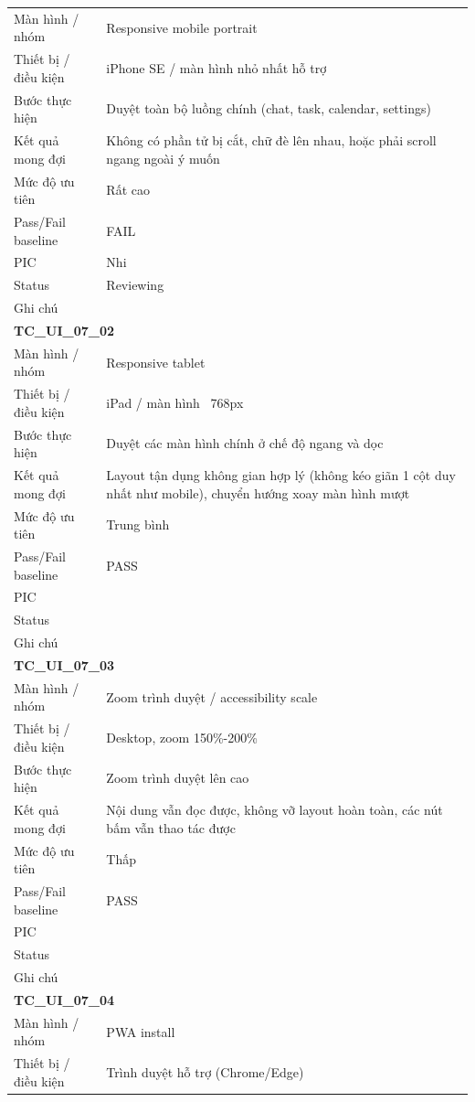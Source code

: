 \documentclass[12pt,a4paper]{article}
\begin{document}
\begin{longtable}{p{3.0cm}p{11.5cm}}
Màn hình / nhóm & Responsive mobile portrait \\
Thiết bị / điều kiện & iPhone SE / màn hình nhỏ nhất hỗ trợ \\
Bước thực hiện & Duyệt toàn bộ luồng chính (chat, task, calendar, settings) \\
Kết quả mong đợi & Không có phần tử bị cắt, chữ đè lên nhau, hoặc phải scroll ngang ngoài ý muốn \\
Mức độ ưu tiên & Rất cao \\
Pass/Fail baseline & FAIL \\
PIC & Nhi \\
Status & Reviewing \\
Ghi chú &  \\
\midrule
\multicolumn{2}{l}{\textbf{TC\_UI\_07\_02}} \\
Màn hình / nhóm & Responsive tablet \\
Thiết bị / điều kiện & iPad / màn hình ~768px \\
Bước thực hiện & Duyệt các màn hình chính ở chế độ ngang và dọc \\
Kết quả mong đợi & Layout tận dụng không gian hợp lý (không kéo giãn 1 cột duy nhất như mobile), chuyển hướng xoay màn hình mượt \\
Mức độ ưu tiên & Trung bình \\
Pass/Fail baseline & PASS \\
PIC &  \\
Status &  \\
Ghi chú &  \\
\midrule
\multicolumn{2}{l}{\textbf{TC\_UI\_07\_03}} \\
Màn hình / nhóm & Zoom trình duyệt / accessibility scale \\
Thiết bị / điều kiện & Desktop, zoom 150\%-200\% \\
Bước thực hiện & Zoom trình duyệt lên cao \\
Kết quả mong đợi & Nội dung vẫn đọc được, không vỡ layout hoàn toàn, các nút bấm vẫn thao tác được \\
Mức độ ưu tiên & Thấp \\
Pass/Fail baseline & PASS \\
PIC &  \\
Status &  \\
Ghi chú &  \\
\midrule
\multicolumn{2}{l}{\textbf{TC\_UI\_07\_04}} \\
Màn hình / nhóm & PWA install \\
Thiết bị / điều kiện & Trình duyệt hỗ trợ (Chrome/Edge) \\

\end{longtable}
\end{document}
